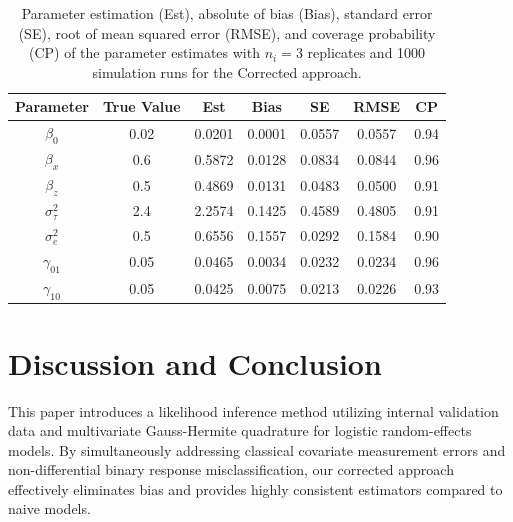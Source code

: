 \documentclass[twoside]{article}
\begin{document}
\vspace{-0.5cm}
\begin{table}[h]
\caption{\footnotesize{Parameter estimation (Est), absolute of bias (Bias), standard error (SE), root of mean squared error (RMSE), and coverage probability (CP) of the parameter estimates with $n_i=3$ replicates and 1000 simulation runs for the Corrected approach.}
\label{tab2}} 
\centering
 \begin{tabular}{ccccccc}
\hline 
Parameter &True Value &  Est & Bias & SE & RMSE & CP
\\\hline
$\beta_{0}$&0.02 & 0.0201&0.0001&0.0557&0.0557&0.94  \\
$\beta_{x}$&0.6&0.5872&0.0128&0.0834&0.0844&0.96 \\ 
$\beta_{z}$&0.5&0.4869&0.0131&0.0483&0.0500&0.91\\
$\sigma_{\tau}^2$&2.4&2.2574&0.1425&0.4589&0.4805&0.91\\
$\sigma_e^2$&0.5&0.6556&0.1557&0.0292&0.1584&0.90\\
$\gamma_{01}$&0.05&0.0465&0.0034&0.0232&0.0234&0.96\\
$\gamma_{10}$&0.05&0.0425&0.0075&0.0213&0.0226&0.93\\
\hline
\end{tabular}
\end{table}
\vspace{-0.5cm}
\section*{Discussion and Conclusion}   
This paper introduces a likelihood inference method utilizing internal validation data and multivariate Gauss-Hermite quadrature for logistic random-effects models. By simultaneously addressing classical covariate measurement errors and non-differential binary response misclassification, our corrected approach effectively eliminates bias and provides highly consistent estimators compared to naive models.
\end{document}
